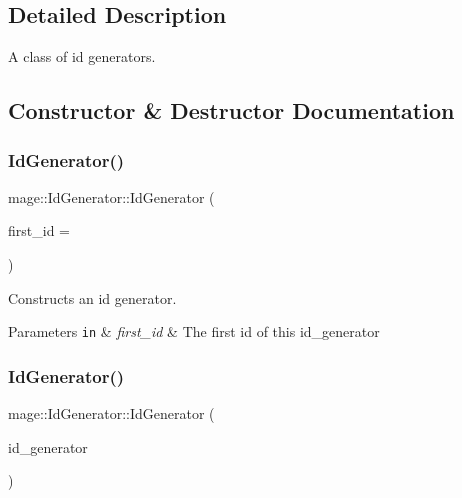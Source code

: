 \subsection{Detailed Description}
A class of id generators. 

\subsection{Constructor \& Destructor Documentation}
\hypertarget{classmage_1_1_id_generator_a59392d3cbba77c323c467fffb539f630}{}\label{classmage_1_1_id_generator_a59392d3cbba77c323c467fffb539f630} 
\subsubsection{\texorpdfstring{Id\+Generator()}{IdGenerator()}\hspace{0.1cm}{\footnotesize\ttfamily [1/3]}}
{\footnotesize\ttfamily mage\+::\+Id\+Generator\+::\+Id\+Generator (\begin{DoxyParamCaption}\item[{\hyperlink{namespacemage_a642e05c5c83642b6946703615cdbf2da}{S32}}]{first\+\_\+id = {} }\end{DoxyParamCaption})\hspace{0.3cm}{\ttfamily [explicit]}}

Constructs an id generator.


\begin{DoxyParams}[1]{Parameters}
\mbox{\tt in}  & {\em first\+\_\+id} & The first id of this id\+\_\+generator \\
\hline
\end{DoxyParams}
\hypertarget{classmage_1_1_id_generator_a6f502d2cd8b63e7c76f31834b028a11d}{}\label{classmage_1_1_id_generator_a6f502d2cd8b63e7c76f31834b028a11d} 
\subsubsection{\texorpdfstring{Id\+Generator()}{IdGenerator()}\hspace{0.1cm}{\footnotesize\ttfamily [2/3]}}
{\footnotesize\ttfamily mage\+::\+Id\+Generator\+::\+Id\+Generator (\begin{DoxyParamCaption}\item[{const \hyperlink{classmage_1_1_id_generator}{Id\+Generator} \&}]{id\+\_\+generator }\end{DoxyParamCaption})\hspace{0.3cm}{\ttfamily [delete]}}

